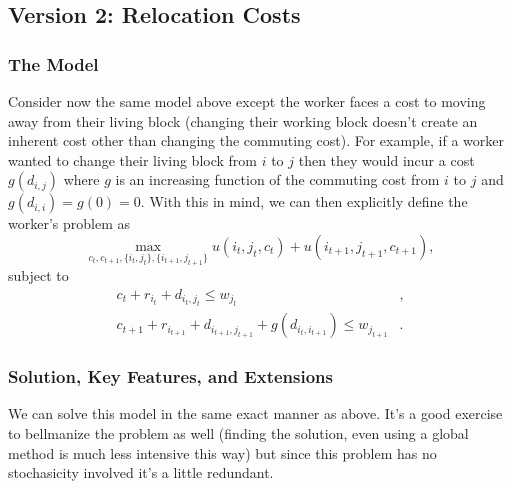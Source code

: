 \documentclass[11pt,english]{article}
\begin{document}
\subsection{Version 2: Relocation Costs}

\subsubsection{The Model}

Consider now the same model above except the worker faces a cost to moving away from their living block (changing their working block doesn't create an inherent cost other than changing the commuting cost). For example, if a worker wanted to change their living block from $i$ to $j$ then they would incur a cost $g(d_{i,j})$ where $g$ is an increasing function of the commuting cost from $i$ to $j$ and $g(d_{i,i}) = g(0) = 0$. With this in mind, we can then explicitly define the worker's problem as $$\max_{c_t, c_{t+1}, \{i_t, j_t\}, \{i_{t+1}, j_{t+1}\}} u\left(i_t,j_t, c_t\right) + u\left(i_{t+1},j_{t+1}, c_{t+1}\right),$$
subject to \begin{align*}
c_t + r_{i_t} + d_{i_t,j_t}\leq w_{j_t}&,\\
c_{t+1} + r_{i_{t+1}} + d_{i_{t+1}, j_{t+1}} + g(d_{i_t, i_{t+1}})\leq w_{j_{t+1}}&.
\end{align*}

\subsubsection{Solution, Key Features, and Extensions}

We can solve this model in the same exact manner as above. It's a good exercise to bellmanize the problem as well (finding the solution, even using a global method is much less intensive this way) but since this problem has no stochasicity involved it's a little redundant.
\end{document}

